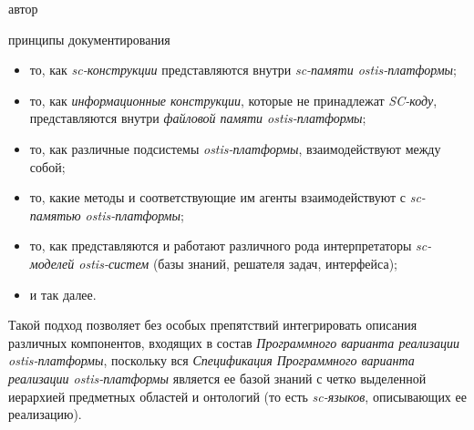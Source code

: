 \begin{SCn}
\begin{scnsubstruct}
\begin{scnrelfromlist}{автор}
\begin{scnrelfromlist}{принципы документирования}
{            \begin{scnindent}
	\begin{itemize}[labelsep=\tabsize-\bulletsize,leftmargin=\tabsize,label=$\bullet$]
		\item то, как \textit{sc-конструкции} представляются внутри \textit{sc-памяти ostis-платформы};
		\item то, как \textit{информационные конструкции}, которые не принадлежат \textit{SC-коду}, представляются внутри \textit{файловой памяти ostis-платформы};
		\item то, как различные подсистемы \textit{ostis-платформы}, взаимодействуют между собой;
		\item то, какие методы и соответствующие им агенты взаимодействуют с \textit{sc-памятью ostis-платформы};
		\item то, как представляются и работают различного рода интерпретаторы \textit{sc-моделей ostis-систем} (базы знаний, решателя задач, интерфейса);
		\item и так далее.
	\end{itemize}
	\end{scnindent}
	Такой подход позволяет без особых препятствий интегрировать описания различных компонентов, входящих в состав \textit{Программного варианта реализации ostis-платформы}, поскольку вся \textit{Спецификация Программного варианта реализации ostis-платформы} является ее базой знаний с четко выделенной иерархией предметных областей и онтологий (то есть \textit{sc-языков}, описывающих ее реализацию).}
        \end{scnrelfromlist}
        \begin{scnindent}

\end{scnindent}
\end{scnrelfromlist}
\end{scnsubstruct}
\end{SCn}

